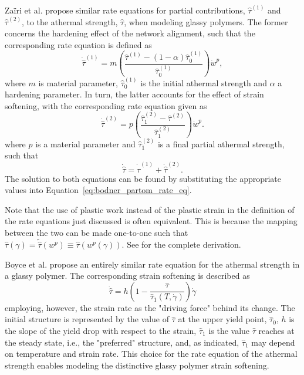 Zaïri et al. \citep{zairiElastoviscoplasticConstitutiveEquations2007} propose similar rate equations for partial contributions, $\hat \tau^{(1)}$ and $\hat \tau^{(2)}$, to the athermal strength, $\hat \tau$, when modeling glassy polymers.
The former concerns the hardening effect of the network alignment, such that the corresponding rate equation is defined as
\begin{equation}
  \dot{\hat\tau}^{(1)} = m\left(\frac{\hat\tau^{(1)} - (1 - \alpha)\hat\tau^{(1)}_0}{\hat\tau^{(1)}_0}\right)\dot w^p,
\end{equation}
where $m$ is material parameter, $\hat\tau^{(1)}_0$ is the initial athermal strength and $\alpha$ a hardening parameter.
In turn, the latter accounts for the effect of strain softening, with the corresponding rate equation given as
\begin{equation}
  \dot{\hat\tau}^{(2)} = p\left(\frac{\hat\tau^{(2)}_1 - \hat\tau^{(2)}}{\hat\tau^{(2)}_1}\right)\dot w^p.
\end{equation}
where $p$ is a material parameter and $\hat\tau^{(2)}_1$ is a final partial athermal strength, such that
\begin{equation}
  \label{eq:rate_eq_zairi}
  \dot{\hat \tau} = \dot{\hat\tau}^{(1)} + \dot{\hat\tau}^{(2)}.
\end{equation}
The solution to both equations can be found by substituting the appropriate values into Equation~\eqref{eq:bodner_partom_rate_eq}.

Note that the use of plastic work instead of the plastic strain in the definition of the rate equations just discussed is often equivalent.
This is because the mapping between the two can be made one-to-one such that $\hat \tau(\gamma)=\tilde{\hat \tau}(w^p)\equiv \hat\tau(w^p(\gamma))$.
See \cite{desouzanetoComputationalMethodsPlasticity2008} for the complete derivation.

Boyce et al. \citep{boyceLargeInelasticDeformation1988} propose an entirely similar rate equation for the athermal strength in a glassy polymer.
The corresponding strain softening is described as
\begin{equation}
  \label{eq:rate_equation_bpa}
	\dot{\hat \tau}=h \left(1-\frac{\hat \tau}{\hat \tau_{1} \left(T, \dot{\gamma}\right)}\right)\dot{\gamma}
\end{equation}
employing, however, the strain rate as the "driving force" behind its change.
The initial structure is represented by the value of $\hat \tau$ at the upper yield point, $\hat \tau_0$, $h$ is the slope of the yield drop with respect to the strain, $\hat \tau_1$ is the value $\hat \tau$ reaches at the steady state, i.e., the "preferred" structure, and, as indicated, $\hat \tau_1$ may depend on temperature and strain rate.
This choice for the rate equation of the athermal strength enables modeling the distinctive glassy polymer strain softening.


